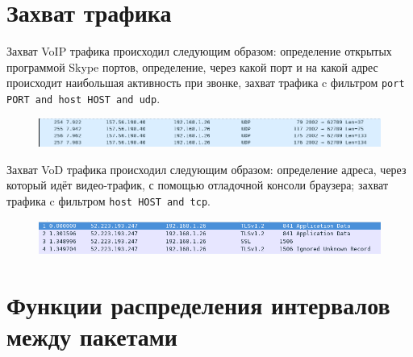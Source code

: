 \documentclass[12pt, a4paper] {ncc}
\begin{document}
	
\section*{Захват трафика}

	Захват VoIP трафика происходил следующим образом: определение открытых программой Skype портов,
	определение, через какой порт и на какой адрес происходит наибольшая активность при звонке,
	захват трафика c фильтром \texttt{port PORT and host HOST and udp}.

	\begin{figure}[h!]
    	\includegraphics[scale=0.5]{./img/skype_pcap.png}
	\end{figure}

	Захват VoD трафика происходил следующим образом: определение адреса, через который идёт
	видео-трафик, с помощью отладочной консоли браузера; захват трафика c фильтром 
	\texttt{host HOST and tcp}.
	\begin{figure}[h!]
    	\includegraphics[scale=0.5]{./img/twirch_pcap.png}
	\end{figure}

\newpage
\section*{Функции распределения интервалов между пакетами}
\end{document}
